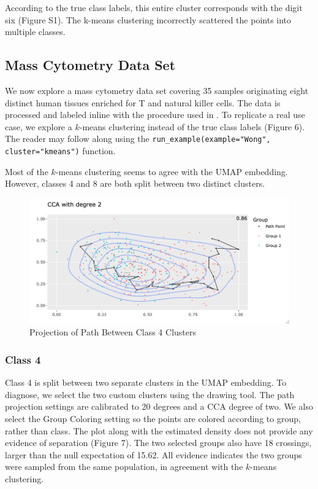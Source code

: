 \documentclass{article}
\begin{document}
{According to the true class labels, this entire cluster corresponds with the digit six (Figure S1). The k-means clustering incorrectly scattered the points into multiple classes.

\subsection{Mass Cytometry Data Set}
We now explore a mass cytometry data set \cite{Wong data set} covering 35 samples originating eight distinct human tissues enriched for T and natural killer cells. The data is processed and labeled inline with the procedure used in \cite{UMAP example}. To replicate a real use case, we explore a $k$-means clustering instead of the true class labels (Figure 6). The reader may follow along using the \texttt{run\_example(example="Wong", cluster="kmeans")} function.

Most of the $k$-means clustering seems to agree with the UMAP embedding. However, classes 4 and 8 are both split between two distinct clusters.

\renewcommand{\figurename}{Figure}
\renewcommand{\thefigure}{7}
\begin{figure}[!t]
\centering
\includegraphics[scale=0.47]{class 4 projection Wong}
\caption{Projection of Path Between Class 4 Clusters}
\end{figure}

\subsubsection{Class 4}
Class 4 is split between two separate clusters in the UMAP embedding. To diagnose, we select the two custom clusters using the drawing tool. The path projection settings are calibrated to 20 degrees and a CCA degree of two. We also select the Group Coloring setting so the points are colored according to group, rather than class. The plot along with the estimated density does not provide any evidence of separation (Figure 7). The two selected groups also have 18 crossings, larger than the null expectation of 15.62. All evidence indicates the two groups were sampled from the same population, in agreement with the $k$-means clustering.

}
\end{document}
